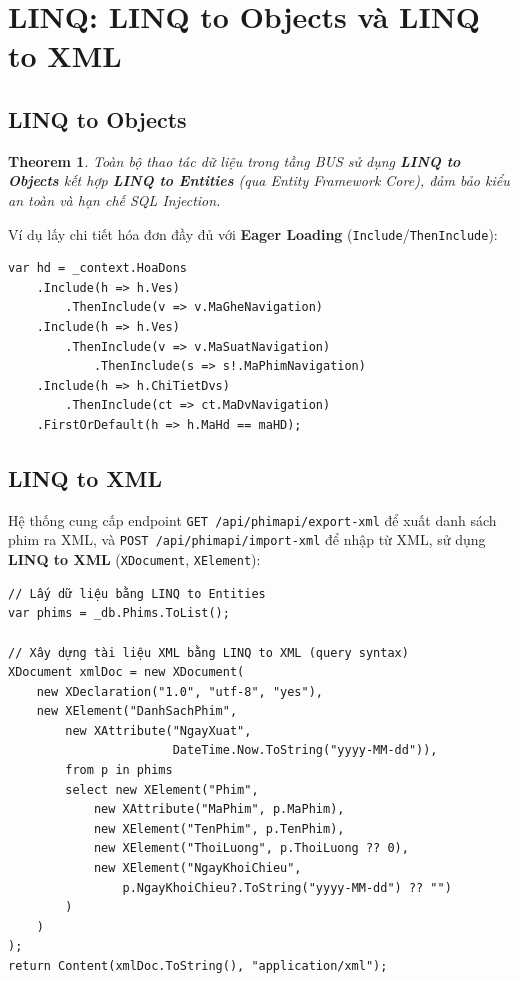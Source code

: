\documentclass[12pt,a4paper,oneside]{book}
\theoremstyle{plain}
\newtheorem{thm}{Theorem}[chapter]
\numberwithin{equation}{chapter}
\begin{document}
\section{LINQ: LINQ to Objects và LINQ to XML}\label{Sec4.2}

\subsection{LINQ to Objects}\label{sub4.2.1}

\begin{thm}\label{thmlinq}
    Toàn bộ thao tác dữ liệu trong tầng BUS sử dụng \textbf{LINQ to Objects} kết hợp \textbf{LINQ to Entities} (qua Entity Framework Core), đảm bảo kiểu an toàn và hạn chế SQL Injection.
\end{thm}

\noindent Ví dụ lấy chi tiết hóa đơn đầy đủ với \textbf{Eager Loading} (\texttt{Include}/\texttt{ThenInclude}):

\begin{lstlisting}[style=csharpstyle, caption={LINQ Eager Loading trong \texttt{HoaDonBUS.LayChiTietHoaDonFull()}}]
var hd = _context.HoaDons
    .Include(h => h.Ves)
        .ThenInclude(v => v.MaGheNavigation)
    .Include(h => h.Ves)
        .ThenInclude(v => v.MaSuatNavigation)
            .ThenInclude(s => s!.MaPhimNavigation)
    .Include(h => h.ChiTietDvs)
        .ThenInclude(ct => ct.MaDvNavigation)
    .FirstOrDefault(h => h.MaHd == maHD);
\end{lstlisting}

\subsection{LINQ to XML}\label{sub4.2.2}

\noindent Hệ thống cung cấp endpoint \texttt{GET /api/phimapi/export-xml} để xuất danh sách phim ra XML, và \texttt{POST /api/phimapi/import-xml} để nhập từ XML, sử dụng \textbf{LINQ to XML} (\texttt{XDocument}, \texttt{XElement}):

\begin{lstlisting}[style=csharpstyle, caption={LINQ to XML -- Export phim ra XML}]
// Lấy dữ liệu bằng LINQ to Entities
var phims = _db.Phims.ToList();

// Xây dựng tài liệu XML bằng LINQ to XML (query syntax)
XDocument xmlDoc = new XDocument(
    new XDeclaration("1.0", "utf-8", "yes"),
    new XElement("DanhSachPhim",
        new XAttribute("NgayXuat", 
                       DateTime.Now.ToString("yyyy-MM-dd")),
        from p in phims
        select new XElement("Phim",
            new XAttribute("MaPhim", p.MaPhim),
            new XElement("TenPhim", p.TenPhim),
            new XElement("ThoiLuong", p.ThoiLuong ?? 0),
            new XElement("NgayKhoiChieu",
                p.NgayKhoiChieu?.ToString("yyyy-MM-dd") ?? "")
        )
    )
);
return Content(xmlDoc.ToString(), "application/xml");
\end{lstlisting}
\end{document}
